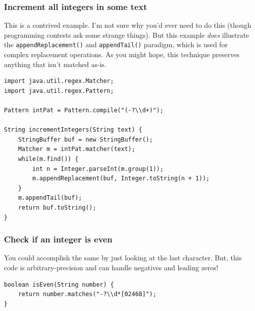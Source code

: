 \documentclass[a4paper,12pt]{article}
\begin{document}
\subsubsection{Increment all integers in some text}
This is a contrived example. I'm not sure why you'd ever need to do this (though programming contests ask some strange things). But this example {\em does} illustrate the \verb/appendReplacement()/ and \verb/appendTail()/ paradigm, which is used for complex replacement operations. As you might hope, this technique preserves anything that isn't matched as-is.
\begin{lstlisting}
import java.util.regex.Matcher;
import java.util.regex.Pattern;

Pattern intPat = Pattern.compile("(-?\\d+)");

String incrementIntegers(String text) {
	StringBuffer buf = new StringBuffer();
	Matcher m = intPat.matcher(text);
	while(m.find()) {
		int n = Integer.parseInt(m.group(1));
		m.appendReplacement(buf, Integer.toString(n + 1));
	}
	m.appendTail(buf);
	return buf.toString();
}
\end{lstlisting}

\subsubsection{Check if an integer is even}
You could accomplish the same by just looking at the last character. But, this code is arbitrary-precision and can handle negatives and leading zeros!
\begin{lstlisting}
boolean isEven(String number) {
	return number.matches("-?\\d*[02468]");
}
\end{lstlisting}
\end{document}

